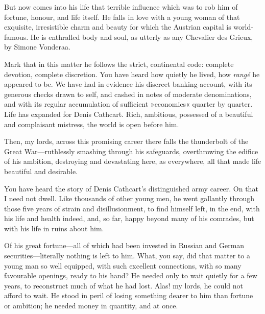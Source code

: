 \begin{dialogue}
\smallskip 

But now comes into his life that terrible influence which was to rob him of fortune, honour, and life itself. He falls in love with a young woman of that exquisite, irresistible charm and beauty for which the Austrian capital is world-famous. He is enthralled body and soul, as utterly as any Chevalier des Grieux, by Simone Vonderaa.

\smallskip 

Mark that in this matter he follows the strict, continental code: complete devotion, complete discretion. You have heard how quietly he lived, how \textit{rangé} he appeared to be. We have had in evidence his discreet banking-account, with its generous checks drawn to self, and cashed in notes of moderate denominations, and with its regular accumulation of sufficient »economies« quarter by quarter. Life has expanded for Denis Cathcart. Rich, ambitious, possessed of a beautiful and complaisant mistress, the world is open before him.

\smallskip 

Then, my lords, across this promising career there falls the thunderbolt of the Great War\allowbreak---\allowbreak ruthlessly smashing through his safeguards, overthrowing the edifice of his ambition, destroying and devastating here, as everywhere, all that made life beautiful and desirable.

\smallskip 

You have heard the story of Denis Cathcart's distinguished army career. On that I need not dwell. Like thousands of other young men, he went gallantly through those five years of strain and disillusionment, to find himself left, in the end, with his life and health indeed, and, so far, happy beyond many of his comrades, but with his life in ruins about him.

\smallskip 

Of his great fortune\allowbreak---\allowbreak all of which had been invested in Russian and German securities\allowbreak---\allowbreak literally nothing is left to him. What, you say, did that matter to a young man so well equipped, with such excellent connections, with so many favourable openings, ready to his hand? He needed only to wait quietly for a few years, to reconstruct much of what he had lost. Alas! my lords, he could not afford to wait. He stood in peril of losing something dearer to him than fortune or ambition; he needed money in quantity, and at once.

\smallskip 


\end{dialogue}
